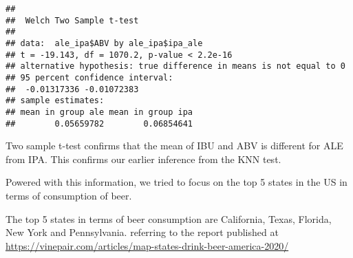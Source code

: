 \documentclass[]{article}
\begin{document}
\begin{verbatim}
## 
##  Welch Two Sample t-test
## 
## data:  ale_ipa$ABV by ale_ipa$ipa_ale
## t = -19.143, df = 1070.2, p-value < 2.2e-16
## alternative hypothesis: true difference in means is not equal to 0
## 95 percent confidence interval:
##  -0.01317336 -0.01072383
## sample estimates:
## mean in group ale mean in group ipa 
##        0.05659782        0.06854641
\end{verbatim}

Two sample t-test confirms that the mean of IBU and ABV is different for
ALE from IPA. This confirms our earlier inference from the KNN test.

Powered with this information, we tried to focus on the top 5 states in
the US in terms of consumption of beer.

The top 5 states in terms of beer consumption are California, Texas,
Florida, New York and Pennsylvania. referring to the report published at
\url{https://vinepair.com/articles/map-states-drink-beer-america-2020/}
\end{document}
